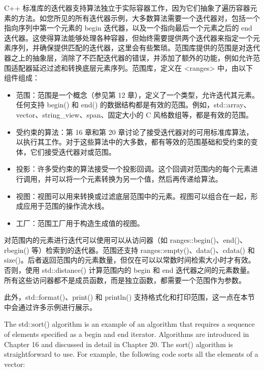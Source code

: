 

C++ 标准库的迭代器支持算法独立于实际容器工作，因为它们抽象了遍历容器元素的方法。如您所见的所有迭代器示例，大多数算法需要一个迭代器对，包括一个指向序列中第一个元素的 begin 迭代器，以及一个指向最后一个元素之后的 end 迭代器。这使得算法能够处理各种容器，但始终需要提供两个迭代器来指定一个元素序列，并确保提供匹配的迭代器，这里会有些繁琐。范围库提供的范围是对迭代器之上的抽象层，消除了不匹配迭代器的错误，并添加了额外的功能，例如允许范围适配器延迟过滤和转换底层元素序列。范围库，定义在 <ranges> 中，由以下组件组成：

\begin{itemize}
\item
范围：范围是一个概念（参见第 12 章），定义了一个类型，允许迭代其元素。任何支持 begin() 和 end() 的数据结构都是有效的范围。例如，std::array、vector、string\_view、span、固定大小的 C 风格数组等，都是有效的范围。

\item
受约束的算法：第 16 章和第 20 章讨论了接受迭代器对的可用标准库算法，以执行其工作。对于这些算法中的大多数，都有等效的范围基础和受约束的变体，它们接受迭代器对或范围。

\item
投影：许多受约束的算法接受一个投影回调。这个回调对范围内的每个元素进行调用，并可以将一个元素转换为另一个值，然后再传递给算法。

\item
视图：视图可以用来转换或过滤底层范围中的元素。视图可以组合在一起，形成应用于范围的操作流水线。

\item
工厂：范围工厂用于构造生成值的视图。
\end{itemize}

对范围内的元素进行迭代可以使用可以从访问器（如 ranges::begin()、end()、rbegin() 等）检索到的迭代器。范围还支持 ranges::empty()、data()、cdata() 和 size()。后者返回范围内的元素数量，但仅在可以以常数时间检索大小时才有效。否则，使用 std::distance() 计算范围内的 begin 和 end 迭代器之间的元素数量。所有这些访问器都不是成员函数，而是独立函数，都需要一个范围作为参数。

此外，std::format()、print() 和 println() 支持格式化和打印范围，这一点在本节中会通过许多示例进行展示。


The std::sort() algorithm is an example of an algorithm that requires a sequence of elements specified as a begin and end iterator. Algorithms are introduced in Chapter 16 and discussed in detail in Chapter 20. The sort() algorithm is straightforward to use. For example, the following code sorts all the elements of a vector:

